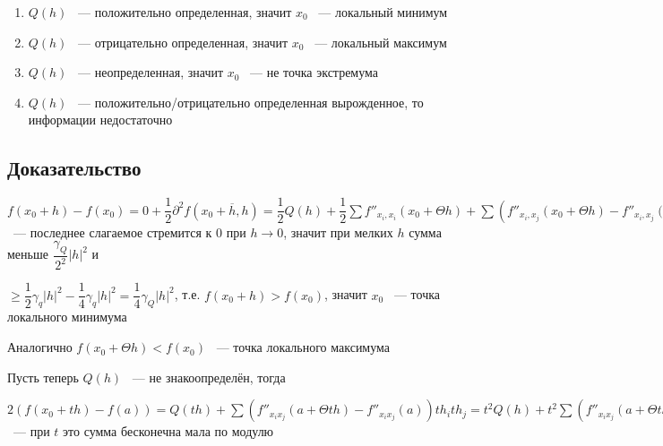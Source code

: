 \documentclass{article}
\begin{document}
            \begin{enumerate}
            
                \item $Q(h)$ ~--- положительно определенная, значит $x_0$ ~--- локальный минимум
                
                \item $Q(h)$ ~--- отрицательно определенная, значит $x_0$ ~--- локальный максимум
                
                \item $Q(h)$ ~--- неопределенная, значит $x_0$ ~--- не точка экстремума
                
                \item $Q(h)$ ~--- положительно/отрицательно определенная вырожденное, то информации недостаточно
                
            \end{enumerate}
            
        \subsection{Доказательство}
        
            $f(x_0 + h) - f(x_0) = 0 + \dfrac{1}{2} \partial^2 f(x_0 + \overline{h}, h) = \dfrac{1}{2} Q(h) + \dfrac{1}{2} \sum f''_{x_i, x_i} (x_0 + \Theta h) + \sum \left( f''_{x_i, x_j} (x_0 + \Theta h) - f''_{x_i, x_j} (x_0) \right)h_i h_j$ ~--- последнее слагаемое стремится к $0$ при $h \rightarrow 0$, значит при мелких $h$ сумма меньше $\dfrac{\gamma_Q}{2^2} |h|^2$ и 
            
            $\geq \dfrac{1}{2} \gamma_q |h|^2 - \dfrac{1}{4} \gamma_q |h|^2 = \dfrac{1}{4} \gamma_Q |h|^2$, т.е. $f(x_0 + h) > f(x_0)$, значит $x_0$ ~--- точка локального минимума
            
            Аналогично $f(x_0 + \Theta h) < f(x_0)$ ~--- точка локального максимума
            
            Пусть теперь $Q(h)$ ~--- не знакоопределён, тогда
            
            $2(f(x_0 + th) - f(a)) = Q(th) + \sum(f''_{x_i x_j} (a + \Theta t h) - f''_{x_i x_j}(a)) th_i th_j = t^2 Q(h) + t^2 \sum (f''_{x_i x_j} (a + \Theta t h) - f''_{x_i x_j} (a)) h_i h_j$ ~--- при $t$ это сумма бесконечна мала по модулю
            
\end{document}
